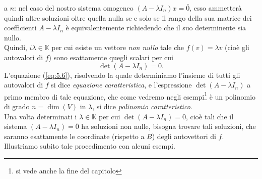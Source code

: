 \documentclass{book}
\begin{document}
a $n$: nel caso del nostro sistema omogeneo $(A-\lambda I_n)x=\bar{0}$, esso ammetterà quindi altre soluzioni
oltre quella nulla se e solo se il rango della sua matrice dei coefficienti $A-\lambda I_n$ è equivalentemente
richiedendo che il suo determinente sia nullo.\\
Quindi, $i\lambda \in \mathds{K}$ per cui esiste un vettore \textit{non nullo} tale che $f(v)=\lambda v$ (cioè
gli autovalori di $f$) sono esattamente quegli scalari per cui
\begin{equation}
  \label{eq:5.6}
  \det(A-\lambda I_n)= 0.
\end{equation}
L'equazione (\ref{eq:5.6}), risolvendo la quale determiniamo l'insieme di tutti gli autovalori di $f$ si dice
\textit{equazione caratteristica}, e l'espressione $\det(A-\lambda I_n)$ a primo membro di tale equazione, che
come vedremo negli esempi\footnote{si vede anche la fine del capitolo} è un polinomio di grado $n=\dim(V)$ in
$\lambda$, si dice \emph{polinomio caratteristico}.\\
Una volta determinati i $\lambda \in \mathds{K}$ per cui $\det(A-\lambda I_n)=0$, cioè tali che il sistema
$(A-\lambda I_n)=\bar{0}$ ha soluzioni non nulle, bisogna trovare tali soluzioni, che saranno esattamente le
coordinate (rispetto a $B$) degli autovettori di $f$.
\clearpage
Illustriamo subito tale procedimento con alcuni esempi.
\end{document}
